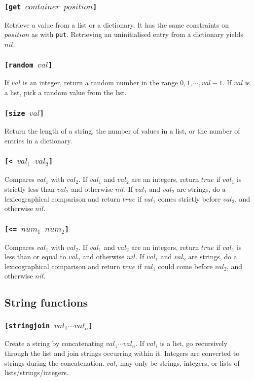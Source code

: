 \subsubsection{\tt{[get }$container$ $position$\tt{]}}
Retrieve a value from a list or a dictionary. It has the same constraints on $position$ as with \verb|put|. Retrieving an uninitialised entry from a dictionary yields $nil$.
\subsubsection{\tt{[random }$val$\tt{]}}
If $val$ is an integer, return a random number in the range $0,1, \cdots, val -1$. If $val$ is a list, pick a random value from the list.
\subsubsection{\tt{[size }$val$\tt{]}}
Return the length of a string, the number of values in a list, or the number of entries in a dictionary.
\subsubsection{\tt{[< }$val_1$ $val_2$\tt{]}}
Compares $val_1$ with $val_2$. If $val_1$ and $val_2$ are an integers, return $true$ if $val_1$ is strictly less than $val_2$ and otherwise $nil$.
If $val_1$ and $val_2$ are strings, do a lexicographical comparison and return $true$ if $val_1$ comes strictly before $val_2$, and otherwise $nil$.
\subsubsection{\tt{[<= }$num_1$ $num_2$\tt{]}}
Compares $val_1$ with $val_2$. If $val_1$ and $val_2$ are an integers, return $true$ if $val_1$ is less than or equal to $val_2$ and otherwise $nil$.
If $val_1$ and $val_2$ are strings, do a lexicographical comparison and return $true$ if $val_1$ could come before $val_2$, and otherwise $nil$.

\subsection{String functions}
\subsubsection{\tt{[stringjoin }$val_1\cdots val_n$\tt{]}}
Create a string by concatenating $val_1\cdots val_n$.
If $val_i$ is a list, go recursively through the list and join strings occurring within it. Integers are converted to strings during the concatenation. $val_i$ may only be strings, integers, or lists of lists/strings/integers.
